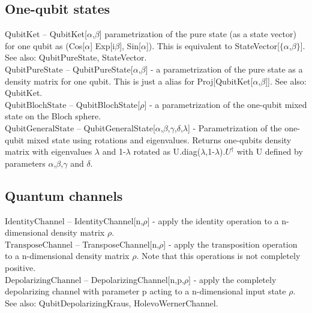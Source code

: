 \subsection{One-qubit states}

\noindent\textbf{$ \text{QubitKet} $ }-- QubitKet[$\alpha $,$\beta $] parametrization of the pure state (as a state vector) for one qubit as (Cos[$\alpha $] Exp[i$\beta $], Sin[$\alpha $]). This is equivalent to StateVector[$\{\alpha $,$\beta \}$]. See also: QubitPureState, StateVector.$  $\\[6pt]

\noindent\textbf{$ \text{QubitPureState} $ }-- QubitPureState[$\alpha $,$\beta $] - a parametrization of the pure state as a density matrix for one qubit. This is just a alias for Proj[QubitKet[$\alpha $,$\beta $]]. See also: QubitKet.$  $\\[6pt]

\noindent\textbf{$ \text{QubitBlochState} $ }-- QubitBlochState[$\rho $] - a parametrization of the one-qubit mixed state on the Bloch sphere.$  $\\[6pt]

\noindent\textbf{$ \text{QubitGeneralState} $ }-- QubitGeneralState[$\alpha $,$\beta $,$\gamma $,$\delta $,$\lambda $] - Parametrization of the one-qubit mixed state using rotations and eigenvalues. Returns one-qubits density matrix with eigenvalues $\lambda $ and 1-$\lambda $ rotated as U.diag($\lambda $,1-$\lambda $).$ U^{\dagger } $ with U defined by parameters $\alpha $,$\beta $,$\gamma $ and $\delta $.$  $\\[6pt]

\subsection{Quantum channels}

\noindent\textbf{$ \text{IdentityChannel} $ }-- IdentityChannel[n,$\rho $] - apply the identity operation to a n-dimensional density matrix $\rho $.$  $\\[6pt]

\noindent\textbf{$ \text{TransposeChannel} $ }-- TransposeChannel[n,$\rho $] - apply the transposition operation to a n-dimensional density matrix $\rho $. Note that this operations is not completely positive.$  $\\[6pt]

\noindent\textbf{$ \text{DepolarizingChannel} $ }-- DepolarizingChannel[n,p,$\rho $] - apply the completely depolarizing channel with parameter p acting to a n-dimensional input state $\rho $. See also: QubitDepolarizingKraus, HolevoWernerChannel.$  $\\[6pt]

